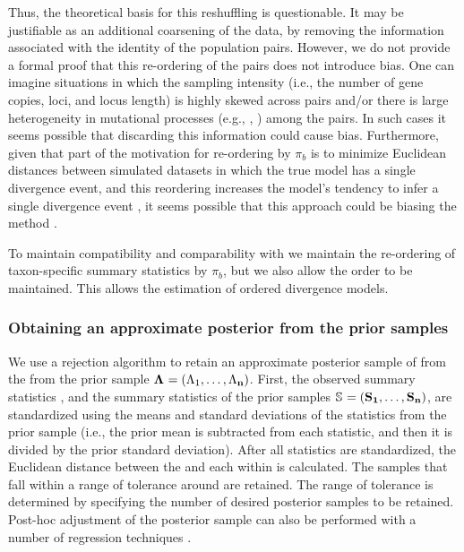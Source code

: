 \documentclass[letterpaper,12pt]{article}
\begin{document}
\begin{linenumbers}
Thus, the theoretical basis for this reshuffling is questionable.
It may be justifiable as an additional coarsening of the data,
by removing the information associated with the identity of the
population pairs.
However, we do not provide a formal proof that this re-ordering of the pairs
does not introduce bias.
One can imagine situations in which the sampling intensity (i.e., the
number of gene copies, loci, and locus length) is highly skewed across
pairs and/or there is large heterogeneity in mutational processes
(e.g., \hkyModel{}{}, \mutationRateScalarConstant{}{}) among the pairs.
In such cases it seems possible that discarding this information could
cause bias.
Furthermore, given that part of the motivation for re-ordering by $\pi_b$ is to
minimize Euclidean distances between simulated datasets in which the true model
has a single divergence event, and this reordering increases the model's
tendency to infer a single divergence event \citep{Huang2011}, it seems
possible that this approach could be biasing the method \citet{Oaks2012}.

To maintain compatibility and comparability with \msb we maintain
the re-ordering of taxon-specific summary statistics by $\pi_b$, but
we also allow the order to be maintained.
This allows the estimation of ordered divergence models.

\subsubsection*{Obtaining an approximate posterior from the prior samples}
We use a rejection algorithm to retain an approximate posterior sample of
\paramSampleVector{} from the from the prior sample
$\boldsymbol{\Lambda_{}} = (\Lambda_{1}, \ldots, \Lambda_{\mathbf{n}})$.
First, the observed summary statistics \ssVectorObs, and the summary statistics
of the prior samples 
$\ssMatrix = (\ssVector{1}, \ldots, \ssVector{\numPriorSamples})$,
are standardized using the means and standard deviations of the statistics from
the prior sample (i.e., the prior mean is subtracted from each statistic, and then
it is divided by the prior standard deviation).
After all statistics are standardized, the Euclidean distance between
the \ssVectorObs and each \ssVector{} within \ssMatrix is calculated.
The samples that fall within a range of tolerance \tol around \ssVectorObs
are retained.
The range of tolerance is determined by specifying the number of desired
posterior samples to be retained.
Post-hoc adjustment of the posterior sample can also be performed with a number
of regression techniques \citep{Beaumont2002,Blum2009,Leuenberger2010}.



\end{linenumbers}
\end{document}
